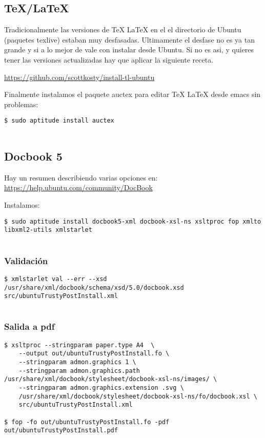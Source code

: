 \subsection{TeX/LaTeX}\label{texlatex}

Tradicionalmente las versiones de TeX LaTeX en el el directorio de
Ubuntu (paquetes texlive) estaban muy desfasadas. Ultimamente el desfase
no es ya tan grande y si a lo mejor de vale con instalar desde Ubuntu.
Si no es asi, y quieres tener las versiones actualizadas hay que aplicar
la siguiente receta.

\url{https://github.com/scottkosty/install-tl-ubuntu}

Finalmente instalamos el paquete auctex para editar TeX LaTeX desde
emacs sin problemas:

\begin{verbatim}
$ sudo aptitude install auctex
      
\end{verbatim}

\subsection{Docbook 5}\label{docbook-5}

Hay un resumen describiendo varias opciones en:
\url{https://help.ubuntu.com/community/DocBook}

Instalamos:

\begin{verbatim}
$ sudo aptitude install docbook5-xml docbook-xsl-ns xsltproc fop xmlto libxml2-utils xmlstarlet
      
\end{verbatim}

\subsubsection{Validación}\label{validaciuxf3n}

\begin{verbatim}
$ xmlstarlet val --err --xsd /usr/share/xml/docbook/schema/xsd/5.0/docbook.xsd src/ubuntuTrustyPostInstall.xml
        
\end{verbatim}

\subsubsection{Salida a pdf}\label{salida-a-pdf}

\begin{verbatim}
$ xsltproc --stringparam paper.type A4  \
    --output out/ubuntuTrustyPostInstall.fo \
    --stringparam admon.graphics 1 \
    --stringparam admon.graphics.path /usr/share/xml/docbook/stylesheet/docbook-xsl-ns/images/ \
    --stringparam admon.graphics.extension .svg \
    /usr/share/xml/docbook/stylesheet/docbook-xsl-ns/fo/docbook.xsl \
    src/ubuntuTrustyPostInstall.xml

$ fop -fo out/ubuntuTrustyPostInstall.fo -pdf out/ubuntuTrustyPostInstall.pdf
        
\end{verbatim}


